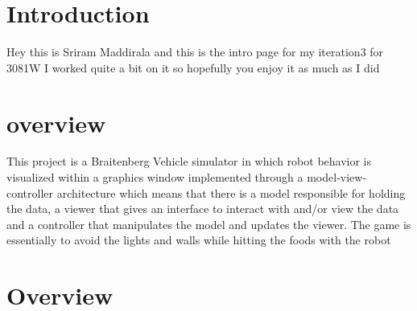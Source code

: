 \hypertarget{index_intro_sec}{}\section{Introduction}\label{index_intro_sec}
Hey this is Sriram Maddirala and this is the intro page for my iteration3 for 3081W I worked quite a bit on it so hopefully you enjoy it as much as I did\hypertarget{index_overview}{}\section{overview}\label{index_overview}
This project is a Braitenberg Vehicle simulator in which robot behavior is visualized within a graphics window implemented through a model-\/view-\/controller architecture which means that there is a model responsible for holding the data, a viewer that gives an interface to interact with and/or view the data and a controller that manipulates the model and updates the viewer. The game is essentially to avoid the lights and walls while hitting the foods with the robot\hypertarget{index_Technical}{}\section{Overview}\label{index_Technical}
